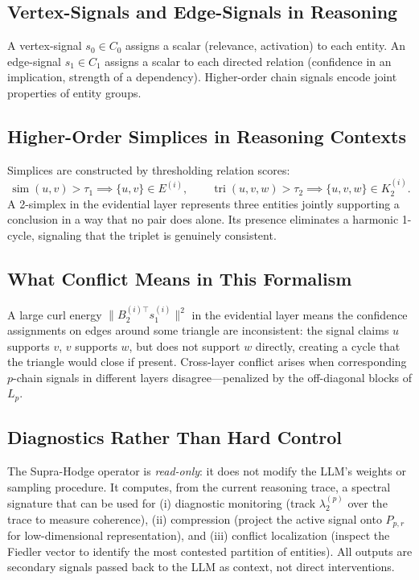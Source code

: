 \documentclass[11pt]{article}
\theoremstyle{definition}
\theoremstyle{remark}
\newcommand{\Pp}{P_{p,r}}
\DeclareMathOperator{\simop}{sim}
\DeclareMathOperator{\tri}{tri}
\begin{document}
\subsection{Vertex-Signals and Edge-Signals in Reasoning}

A vertex-signal $s_0\in C_0$ assigns a scalar (relevance, activation) to each
entity. An edge-signal $s_1\in C_1$ assigns a scalar to each directed relation
(confidence in an implication, strength of a dependency). Higher-order chain
signals encode joint properties of entity groups.

\subsection{Higher-Order Simplices in Reasoning Contexts}

Simplices are constructed by thresholding relation scores:
\[
  \simop(u,v)>\tau_1 \implies \{u,v\}\in E^{(i)},\qquad
  \tri(u,v,w)>\tau_2 \implies \{u,v,w\}\in K_2^{(i)}.
\]
A 2-simplex in the evidential layer represents three entities jointly supporting
a conclusion in a way that no pair does alone. Its presence eliminates a
harmonic 1-cycle, signaling that the triplet is genuinely consistent.

\subsection{What Conflict Means in This Formalism}

A large curl energy $\|B_2^{(i)\top}s_1^{(i)}\|^2$ in the evidential layer
means the confidence assignments on edges around some triangle are
inconsistent: the signal claims $u$ supports $v$, $v$ supports $w$, but does
not support $w$ directly, creating a cycle that the triangle would close if
present. Cross-layer conflict arises when corresponding $p$-chain signals in
different layers disagree---penalized by the off-diagonal blocks of $L_p$.

\subsection{Diagnostics Rather Than Hard Control}

The Supra-Hodge operator is \emph{read-only}: it does not modify the LLM's
weights or sampling procedure. It computes, from the current reasoning trace, a
spectral signature that can be used for (i) diagnostic monitoring (track
$\lambda_2^{(p)}$ over the trace to measure coherence), (ii) compression
(project the active signal onto $\Pp$ for low-dimensional representation), and
(iii) conflict localization (inspect the Fiedler vector to identify the
most contested partition of entities). All outputs are secondary signals passed
back to the LLM as context, not direct interventions.
\end{document}
